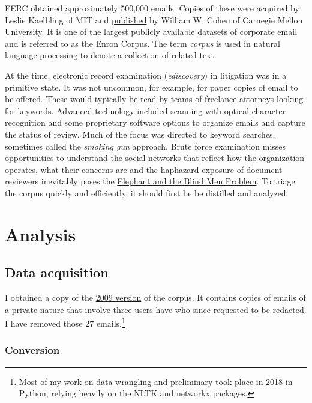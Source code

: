 \documentclass[]{article}
\let\rmarkdownfootnote\footnote%
\def\footnote{\protect\rmarkdownfootnote}
\begin{document}
FERC obtained approximately 500,000 emails. Copies of these were
acquired by Leslie Kaelbling of MIT and
\href{https://www.cs.cmu.edu/~./enron/}{published} by William W. Cohen
of Carnegie Mellon University. It is one of the largest publicly
available datasets of corporate email and is referred to as the Enron
Corpus. The term \emph{corpus} is used in natural language processing to
denote a collection of related text.

At the time, electronic record examination (\emph{ediscovery}) in
litigation was in a primitive state. It was not uncommon, for example,
for paper copies of email to be offered. These would typically be read
by teams of freelance attorneys looking for keywords. Advanced
technology included scanning with optical character recognition and some
proprietary software options to organize emails and capture the status
of review. Much of the focus was directed to keyword searches, sometimes
called the \emph{smoking gun} approach. Brute force examination misses
opportunities to understand the social networks that reflect how the
organization operates, what their concerns are and the haphazard
exposure of document reviewers inevitably poses the
\href{https://buddhismnow.com/2018/02/16/tittha-sutta-buddhist-parable-of-the-blind-men-and-the-elephant/}{Elephant
and the Blind Men Problem}. To triage the corpus quickly and
efficiently, it should first be be distilled and analyzed.

\hypertarget{analysis}{%
\section{Analysis}\label{analysis}}

\hypertarget{data-acquisition}{%
\subsection{Data acquisition}\label{data-acquisition}}

I obtained a copy of the \href{}{2009 version} of the corpus. It
contains copies of emails of a private nature that involve three users
have who since requested to be
\href{https://www.cs.cmu.edu/~./enron/DELETIONS.txt}{redacted}. I have
removed those 27 emails.\footnote{Most of my work on data wrangling and
  preliminary took place in 2018 in Python, relying heavily on the NLTK
  and networkx packages.}

\hypertarget{conversion}{%
\subsubsection{Conversion}\label{conversion}}
\end{document}

